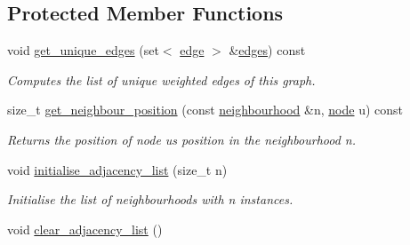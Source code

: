 \subsection*{Protected Member Functions}
\begin{DoxyCompactItemize}
\item 
void \hyperlink{classlgraph_1_1utils_1_1udgraph_a26dbf1e2606613bd392e670e81d38a60}{get\+\_\+unique\+\_\+edges} (set$<$ \hyperlink{namespacelgraph_1_1utils_a6510284ce1b1ae5dc97ce5d2de426e10}{edge} $>$ \&\hyperlink{classlgraph_1_1utils_1_1uxgraph_ade877f3a9cf71d844cfe7b6c4f8aae10}{edges}) const 
\begin{DoxyCompactList}\small\item\em Computes the list of unique weighted edges of this graph. \end{DoxyCompactList}\item 
size\+\_\+t \hyperlink{classlgraph_1_1utils_1_1xxgraph_aac7ef2134cad9529869f1334de7892d9}{get\+\_\+neighbour\+\_\+position} (const \hyperlink{namespacelgraph_1_1utils_a0f2ef47028a466d26841709e705390ac}{neighbourhood} \&n, \hyperlink{namespacelgraph_1_1utils_a7bd66ede3805ef121bc2835bd48de0cf}{node} u) const 
\begin{DoxyCompactList}\small\item\em Returns the position of node {\itshape u\textquotesingle{}s} position in the neighbourhood {\itshape n}. \end{DoxyCompactList}\item 
void \hyperlink{classlgraph_1_1utils_1_1xxgraph_a2201aaff5e9ffa29a9b3abfde705dd46}{initialise\+\_\+adjacency\+\_\+list} (size\+\_\+t n)\hypertarget{classlgraph_1_1utils_1_1xxgraph_a2201aaff5e9ffa29a9b3abfde705dd46}{}\label{classlgraph_1_1utils_1_1xxgraph_a2201aaff5e9ffa29a9b3abfde705dd46}

\begin{DoxyCompactList}\small\item\em Initialise the list of neighbourhoods with {\itshape n} instances. \end{DoxyCompactList}\item 
void \hyperlink{classlgraph_1_1utils_1_1xxgraph_a6523402d0ec66918b95de23d2bee38fc}{clear\+\_\+adjacency\+\_\+list} ()\hypertarget{classlgraph_1_1utils_1_1xxgraph_a6523402d0ec66918b95de23d2bee38fc}{}\label{classlgraph_1_1utils_1_1xxgraph_a6523402d0ec66918b95de23d2bee38fc}


\end{DoxyCompactItemize}
